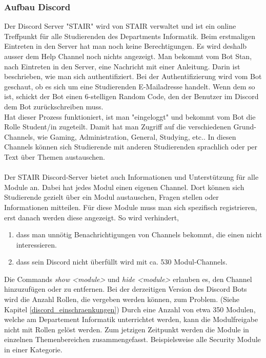 \documentclass[a4paper, table]{article}
\begin{document}
\subsubsection{Aufbau Discord}
Der Discord Server "STAIR" wird von STAIR verwaltet und ist ein online Treffpunkt für alle Studierenden des Departments Informatik. 
Beim erstmaligen Eintreten in den Server hat man noch keine Berechtigungen. 
Es wird deshalb ausser dem Help Channel noch nichts angezeigt. 
Man bekommt vom Bot Stan, nach Eintreten in den Server, eine Nachricht mit einer Anleitung. 
Darin ist beschrieben, wie man sich authentifiziert. 
Bei der Authentifizierung wird vom Bot geschaut, ob es sich um eine Studierenden E-Mailadresse handelt. 
Wenn dem so ist, schickt der Bot einen 6-stelligen Random Code, den der Benutzer im Discord dem Bot zurückschreiben muss.\\
Hat dieser Prozess funktioniert, ist man "eingeloggt" und bekommt vom Bot die Rolle Student/in zugeteilt. 
Damit hat man Zugriff auf die verschiedenen Grund-Channels, wie Gaming, Administration, General, Studying, etc.. 
In diesen Channels können sich Studierende mit anderen Studierenden sprachlich oder per Text über Themen austauschen.\\\\
Der STAIR Discord-Server bietet auch Informationen und Unterstützung für alle Module an. 
Dabei hat jedes Modul einen eigenen Channel. 
Dort können sich Studierende gezielt über ein Modul austauschen, Fragen stellen oder Informationen mitteilen. 
Für diese Module muss man sich spezifisch registrieren, erst danach werden diese angezeigt. 
So wird verhindert,
\begin{enumerate}
    \item dass man unn\"otig Benachrichtigungen von Channels bekommt, die einen nicht interessieren.
    \item dass sein Discord nicht \"uberf\"ullt wird mit ca. 530 Modul-Channels.
\end{enumerate}
Die Commands \textit{show <module>} und \textit{hide <module>} erlauben es, den Channel hinzuzuf\"ugen oder zu entfernen.
Bei der derzeitigen Version des Discord Bots wird die Anzahl Rollen, die vergeben werden können, zum Problem. 
(Siehe Kapitel \ref{discord_einschraenkungen})
Durch eine Anzahl von etwa 350 Modulen, welche am Departement Informatik unterrichtet werden, kann die Modulfreigabe nicht mit Rollen gelöst werden. 
Zum jetzigen Zeitpunkt werden die Module in einzelnen Themenbereichen zusammengefasst. 
Beispielsweise alle Security Module in einer Kategorie. 
\end{document}
